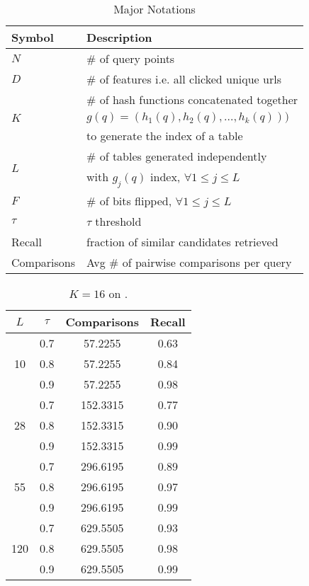 \documentclass[11pt]{article}
\begin{document}
\begin{table}
\centering
{
\small \addtolength{\tabcolsep}{-4.5pt}
\begin{tabular}{ll}
\hline
\hline
 \textbf{Symbol} &  \textbf{Description} \\
\hline 
$N$ & \# of query points \\
$D$ & \# of features i.e. all clicked unique urls \\
\hline
\multirow{3}{*}{$K$} & \# of hash functions concatenated together \\ 
   & $g(q)=(h_1(q),h_2(q),\dots,h_k(q)))$ \\ 
	 & to generate the index of a table \\
\hline
 \multirow{2}{*}{$L$} & \# of tables generated independently \\ 
	  &  with $g_j(q)$ index, $\forall 1 \leq j \leq  L$  \\
\hline
$F$ & \# of bits flipped, $\forall 1 \leq j \leq  L$   \\
$\tau$ & $\tau$ threshold \\
Recall & fraction of similar candidates retrieved \\
Comparisons & Avg \# of pairwise comparisons per query  \\
\hline 
\end{tabular}
\caption{\footnotesize{Major Notations}}
}
\label{tab:notation}
\end{table}

\begin{table}
\centering
\begin{tabular}{|c|c|c|c|}
\hline
$L$ & $\tau$ & Comparisons & Recall \\
\hline
\multirow{3}{*}{10}  & 0.7 & 57.2255 & 0.63 \\
 & 0.8 & 57.2255 & 0.84 \\
 & 0.9 & 57.2255 & 0.98 \\
\hline
\multirow{3}{*}{28} & 0.7 & 152.3315 & 0.77 \\
 & 0.8 & 152.3315 & 0.90 \\
 & 0.9 & 152.3315 & 0.99 \\
\hline
\multirow{3}{*}{55} & 0.7 & 296.6195 & 0.89 \\
 & 0.8 & 296.6195 & 0.97 \\
 & 0.9 & 296.6195 & 0.99 \\
\hline
\multirow{3}{*}{120} & 0.7 & 629.5505 & 0.93 \\
 & 0.8 & 629.5505 & 0.98 \\
 & 0.9 & 629.5505 & 0.99 \\
\hline 
 \end{tabular}
\caption{\footnotesize{$K=16$ on \aol.}}
\label{tab:data-so}
\end{table}
\end{document}
